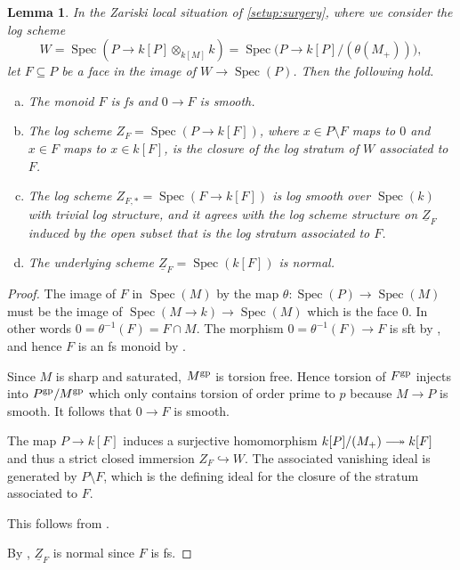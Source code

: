 \documentclass[a4paper,twoside,11pt,reqno]{amsart}
\DeclareRobustCommand\longtwoheadrightarrow {\relbar\joinrel\twoheadrightarrow}
\newcommand{\surj}{\longtwoheadrightarrow}
\newcommand{\inj}{\hookrightarrow}
\DeclareMathOperator{\Spec}{Spec}
\newcommand{\gp}{{\rm gp}}
\newtheorem{lem}[thm]{Lemma}
\theoremstyle{definition}
\numberwithin{equation}{subsection}
\begin{document}
\begin{lem} \label{lem:strata-closures}
     In the Zariski local situation of \cref{setup:surgery}, where we consider the log scheme  
    \[
         W = \Spec(P\to k[P]\otimes_{k[M]} k) = \Spec\big(P\to k[P]/(\theta(M_+))\big),
    \]  
    let $F \subseteq P$ be a face in the image of $W \to \Spec(P)$. Then the following hold.
    \begin{enumerate}[(a)]
        \item  \label{lemitem:strata-closures1}
        The monoid $F$ is fs and $0 \to F$ is smooth.
        
        \item \label{lemitem:strata-closures2}
        The log scheme $Z_F = \Spec(P \to k[F])$, where $x \in P \setminus F$ maps to $0$ and $x \in F$ maps to $x \in k[F]$, is the closure of the log stratum of $W$ associated to $F$.
        
        \item  \label{lemitem:strata-closures3}
        The log scheme $Z_{F,\ast} = \Spec(F \to k[F])$ is log smooth over $\Spec(k)$ with trivial log structure, and it agrees with the log scheme structure on $\underline{Z}_F$ induced by the open subset that is the log stratum associated to $F$.
        
        \item  \label{lemitem:strata-closures4}
        The underlying scheme $\underline{Z}_F = \Spec(k[F])$ is normal.
    \end{enumerate}
\end{lem}
\begin{proof}
     The image of $F$ in $\Spec(M)$ by the map $\theta: \Spec(P) \to \Spec(M)$ must be the image of $\Spec(M \to k) \to \Spec(M)$ which is the face $0$. In other words $0 = \theta^{-1}(F) = F \cap M$. The morphism $0 = \theta^{-1}(F) \to F$ is sft by \cite[Lemma~2.3.2]{AHLS-Log}, and hence $F$ is an fs monoid by \cite[Proposition~2.2.9]{AHLS-Log}.    

    Since $M$ is sharp and saturated, $M^\gp$ is torsion free. Hence torsion of $F^\gp$ injects into $P^\gp/M^\gp$ which only contains torsion of order prime to $p$ because $M \to P$ is smooth. It follows that $0 \to F$ is smooth. 

    The map $P \to k[F]$ induces a surjective homomorphism $k[P]/(M_+) \surj k[F]$ and thus a strict closed immersion $Z_F \inj W$. The associated vanishing ideal is generated by $P \setminus F$, which is the defining ideal for the closure of the stratum associated to $F$.

     This follows from .

    By \cite[Proposition I.3.4.1]{Ogus}, $\underline{Z}_F$ is normal since $F$ is fs. 
\end{proof}
\end{document}
